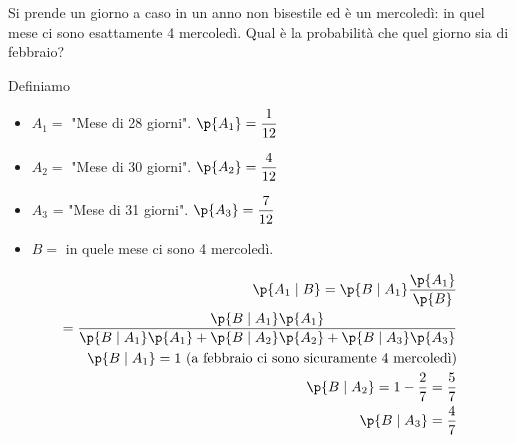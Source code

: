 \begin{exrc}
    Si prende un giorno a caso in un anno non bisestile ed \`e un mercoledì: in quel mese ci sono esattamente 4 mercoledì. Qual \`e la probabilit\`a che quel giorno sia di febbraio?

    Definiamo
    \begin{itemize}
        \item $ A_1 = $ "Mese di 28 giorni". $ \p{A_1} = \dfrac{1}{12} $
        \item $ A_2 = $ "Mese di 30 giorni". $ \p{A_2} = \dfrac{4}{12} $
        \item $ A_3 $ = "Mese di 31 giorni". $ \p{A_3} = \dfrac{7}{12} $
        \item $ B = $ in quele mese ci sono 4 mercoledì.
    \end{itemize}

    \begin{equation*}
        \begin{aligned}
            \p{A_1 \mid B} = \p{B \mid A_1} \dfrac{\p{A_1}}{\p{B}} \\
            = \dfrac{\p{B \mid A_1} \p{A_1}}{\p{B \mid A_1}\p{A_1} + \p{B \mid A_2}\p{A_2} + \p{B \mid A_3}\p{A_3}} \\
            \p{B \mid A_1} = 1 \text{ (a febbraio ci sono sicuramente 4 mercoledì)} \\
            \p{B \mid A_2} = 1 - \dfrac{2}{7} = \dfrac{5}{7}\\
            \p{B \mid A_3} = \dfrac{4}{7}
        \end{aligned}
    \end{equation*}
\end{exrc}


